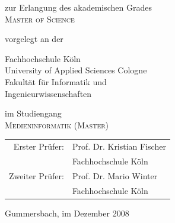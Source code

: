 \begin{titlepage}
\begin{center}
\vspace{0.6cm}

\begin{large}
zur Erlangung des akademischen Grades\\
\vspace{0.2cm}
\textsc{Master of Science}\\ 
\end{large}

\vspace{0.4cm}

\begin{large}
vorgelegt an der\\ 
\vspace{0.2cm}
\begin{scshape}
Fachhochschule Köln\\
University of Applied Sciences Cologne\\
Fakultät für Informatik und\\
Ingenieurwissenschaften\\
\end{scshape}
\end{large}

\vspace{0.4cm}

\begin{large}
im Studiengang\\ 
\vspace{0.2cm}
\textsc{Medieninformatik (Master)}
\end{large}


\vspace{1.0cm}

\begin{tabular}{rl}
        Erster Prüfer:  &  Prof. Dr. Kristian Fischer\\
       							    &  \small Fachhochschule Köln \\[1.0em]
       Zweiter Prüfer:  &  Prof. Dr. Mario Winter\\
       							    &  \small Fachhochschule Köln \\
\end{tabular}

\vspace{0.6cm}

\begin{large}
Gummersbach, im Dezember 2008
\end{large}


\end{center}
\end{titlepage}

